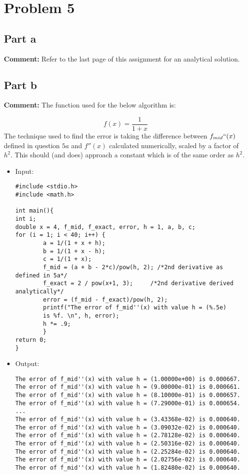 \documentclass[10pt]{article}
\begin{document}
\section{Problem 5}
\subsection{Part a}
\textbf{Comment:} Refer to the last page of this assignment for an analytical solution.
\subsection{Part b}
\textbf{Comment:} The function used for the below algorithm is:

$$f(x) = \frac{1}{1+x}$$
The technique used to find the error is taking the difference between $f_{mid}``(x)$ defined in question $5a$ and $f''(x)$ calculated numerically, scaled by a factor of $h^2$. This should (and does) approach a constant which is of the same order as $h^2$.
\begin{itemize}
\item Input:
\begin{verbatim}
#include <stdio.h>
#include <math.h>

int main(){
int i;
double x = 4, f_mid, f_exact, error, h = 1, a, b, c;
for (i = 1; i < 40; i++) {
        a = 1/(1 + x + h);
        b = 1/(1 + x - h);
        c = 1/(1 + x);
        f_mid = (a + b - 2*c)/pow(h, 2); /*2nd derivative as defined in 5a*/
        f_exact = 2 / pow(x+1, 3);     /*2nd derivative derived analytically*/
        error = (f_mid - f_exact)/pow(h, 2);
        printf("The error of f_mid''(x) with value h = (%.5e) 
        is %f. \n", h, error);
        h *= .9;
        }
return 0;
}
\end{verbatim}
\item Output:
\begin{verbatim}
The error of f_mid''(x) with value h = (1.00000e+00) is 0.000667. 
The error of f_mid''(x) with value h = (9.00000e-01) is 0.000661. 
The error of f_mid''(x) with value h = (8.10000e-01) is 0.000657. 
The error of f_mid''(x) with value h = (7.29000e-01) is 0.000654. 
...
The error of f_mid''(x) with value h = (3.43368e-02) is 0.000640. 
The error of f_mid''(x) with value h = (3.09032e-02) is 0.000640. 
The error of f_mid''(x) with value h = (2.78128e-02) is 0.000640. 
The error of f_mid''(x) with value h = (2.50316e-02) is 0.000640. 
The error of f_mid''(x) with value h = (2.25284e-02) is 0.000640. 
The error of f_mid''(x) with value h = (2.02756e-02) is 0.000640. 
The error of f_mid''(x) with value h = (1.82480e-02) is 0.000640. 
\end{verbatim}
\end{itemize}
\end{document}
